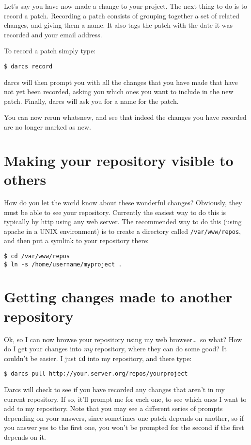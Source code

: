 \documentclass{book}
\begin{document}
Let's say you have now made a change to your project.  The next thing to do
is to record a patch.  Recording a patch consists of grouping together a
set of related changes, and giving them a name.  It also tags the patch
with the date it was recorded and your email address.

To record a patch simply type:
\begin{verbatim}
$ darcs record
\end{verbatim}
darcs will then prompt you with all the changes that you have made that
have not yet been recorded, asking you which ones you want to include in
the new patch.  Finally, darcs will ask you for a name for the patch.

You can now rerun whatsnew, and see that indeed the changes you have
recorded are no longer marked as new.

\section{Making your repository visible to others}
How do you let the world know about these wonderful changes?  Obviously,
they must be able to see your repository.  Currently the easiest way to do
this is typically by http using any web server.  The recommended way to do
this (using apache in a UNIX environment) is to create a directory called
{\tt /var/www/repos}, and then put a symlink to your repository there:
\begin{verbatim}
$ cd /var/www/repos
$ ln -s /home/username/myproject .
\end{verbatim}

\section{Getting changes made to another repository}
Ok, so I can now browse your repository using my web browser\ldots\ so
what? How do I get your changes into \emph{my} repository, where they can
do some good? It couldn't be easier.  I just \verb|cd| into my repository,
and there type:
\begin{verbatim}
$ darcs pull http://your.server.org/repos/yourproject
\end{verbatim}
Darcs will check to see if you have recorded any changes that aren't in my
current repository.  If so, it'll prompt me for each one, to see which ones
I want to add to my repository.  Note that you may see a different series
of prompts depending on your answers, since sometimes one patch depends on
another, so if you answer yes to the first one, you won't be prompted for
the second if the first depends on it.
\end{document}
